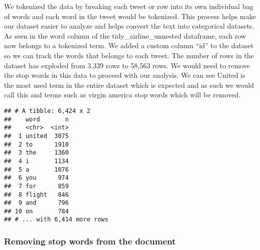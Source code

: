 \documentclass[
]{article}
\newenvironment{Shaded}{\begin{snugshade}}{\end{snugshade}}
\newcommand{\CommentTok}[1]{\textcolor[rgb]{0.56,0.35,0.01}{\textit{#1}}}
\newcommand{\DataTypeTok}[1]{\textcolor[rgb]{0.13,0.29,0.53}{#1}}
\newcommand{\KeywordTok}[1]{\textcolor[rgb]{0.13,0.29,0.53}{\textbf{#1}}}
\newcommand{\NormalTok}[1]{#1}
\newcommand{\OperatorTok}[1]{\textcolor[rgb]{0.81,0.36,0.00}{\textbf{#1}}}
\newcommand{\StringTok}[1]{\textcolor[rgb]{0.31,0.60,0.02}{#1}}
\begin{document}
We tokenized the data by breaking each tweet or row into its own
individual bag of words and each word in the tweet would be tokenized.
This process helps make our dataset easier to analyze and helps convert
the text into categorical datasets. As seen in the word column of the
tidy\_airline\_unnested dataframe, each row now belongs to a tokenized
term. We added a custom column ``id'' to the dataset so we can track the
words that belongs to each tweet. The number of rows in the dataset has
exploded from 3,339 rows to 58,563 rows. We would need to remove the
stop words in this data to proceed with our analysis. We can see United
is the most used term in the entire dataset which is expected and as
such we would call this and terms such as virgin america stop words
which will be removed.

\begin{Shaded}
\end{Shaded}

\begin{verbatim}
## # A tibble: 6,424 x 2
##    word       n
##    <chr>  <int>
##  1 united  3075
##  2 to      1910
##  3 the     1360
##  4 i       1134
##  5 a       1076
##  6 you      974
##  7 for      859
##  8 flight   846
##  9 and      796
## 10 on       784
## # ... with 6,414 more rows
\end{verbatim}

\hypertarget{removing-stop-words-from-the-document}{%
\subsubsection{Removing stop words from the
document}\label{removing-stop-words-from-the-document}}
\end{document}
